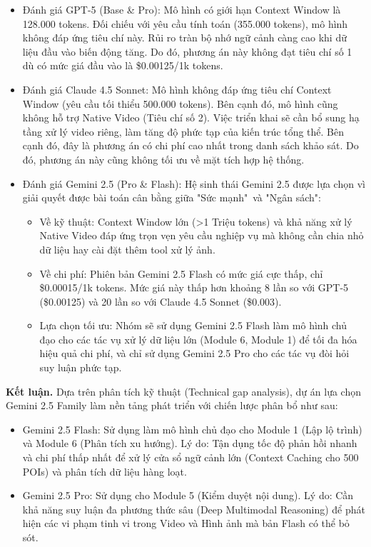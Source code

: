 \begin{itemize}
    \item Đánh giá GPT-5 (Base \& Pro): Mô hình có giới hạn Context Window là 128.000 tokens. Đối chiếu với yêu cầu tính toán (355.000 tokens), mô hình không đáp ứng tiêu chí này. Rủi ro tràn bộ nhớ ngữ cảnh càng cao khi dữ liệu đầu vào biến động tăng. Do đó, phương án này không đạt tiêu chí số 1 dù có mức giá đầu vào là \$0.00125/1k tokens.

    \item Đánh giá Claude 4.5 Sonnet: Mô hình không đáp ứng tiêu chí Context Window (yêu cầu tối thiểu 500.000 tokens). Bên cạnh đó, mô hình cũng không hỗ trợ Native Video (Tiêu chí số 2). Việc triển khai sẽ cần bổ sung hạ tầng xử lý video riêng, làm tăng độ phức tạp của kiến trúc tổng thể. Bên cạnh đó, đây là phương án có chi phí cao nhất trong danh sách khảo sát. Do đó, phương án này cũng không tối ưu về mặt tích hợp hệ thống.

    \item Đánh giá Gemini 2.5 (Pro \& Flash): Hệ sinh thái Gemini 2.5 được lựa chọn vì giải quyết được bài toán cân bằng giữa "Sức mạnh"\ và "Ngân sách":
    \begin{itemize}
        \item Về kỹ thuật: Context Window lớn (>1 Triệu tokens) và khả năng xử lý Native Video đáp ứng trọn vẹn yêu cầu nghiệp vụ mà không cần chia nhỏ dữ liệu hay cài đặt thêm tool xử lý ảnh.
        \item Về chi phí: Phiên bản Gemini 2.5 Flash có mức giá cực thấp, chỉ \$0.00015/1k tokens. Mức giá này thấp hơn khoảng 8 lần so với GPT-5 (\$0.00125) và 20 lần so với Claude 4.5 Sonnet (\$0.003).
        \item Lựa chọn tối ưu: Nhóm sẽ sử dụng Gemini 2.5 Flash làm mô hình chủ đạo cho các tác vụ xử lý dữ liệu lớn (Module 6, Module 1) để tối đa hóa hiệu quả chi phí, và chỉ sử dụng Gemini 2.5 Pro cho các tác vụ đòi hỏi suy luận phức tạp.
    \end{itemize}
\end{itemize}

\textbf{Kết luận.} Dựa trên phân tích kỹ thuật (Technical gap analysis), dự án lựa chọn Gemini 2.5 Family làm nền tảng phát triển với chiến lược phân bổ như sau:

\begin{itemize}
    \item Gemini 2.5 Flash: Sử dụng làm mô hình chủ đạo cho Module 1 (Lập lộ trình) và Module 6 (Phân tích xu hướng). Lý do: Tận dụng tốc độ phản hồi nhanh và chi phí thấp nhất để xử lý cửa sổ ngữ cảnh lớn (Context Caching cho 500 POIs) và phân tích dữ liệu hàng loạt.
    
    \item Gemini 2.5 Pro: Sử dụng cho Module 5 (Kiểm duyệt nội dung). Lý do: Cần khả năng suy luận đa phương thức sâu (Deep Multimodal Reasoning) để phát hiện các vi phạm tinh vi trong Video và Hình ảnh mà bản Flash có thể bỏ sót.
\end{itemize}
